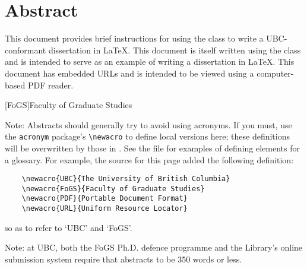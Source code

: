 
\chapter{Abstract}

This document provides brief instructions for using the 
class to write a \acs{UBC}-conformant dissertation in \LaTeX.  This
document is itself written using the  class and is
intended to serve as an example of writing a dissertation in \LaTeX.
This document has embedded \acp{URL} and is intended to be viewed
using a computer-based \ac{PDF} reader.

[FoGS]{Faculty of Graduate Studies}

Note: Abstracts should generally try to avoid using acronyms.  If you
must, use the \verb+acronym+ package's \verb+\newacro+ to define
local versions here; these definitions will be overwritten by those
in .  See the  file for
examples of defining elements for a glossary.
For example, the source for this page added the following definition:
\begin{verbatim}
    \newacro{UBC}{The University of British Columbia}
    \newacro{FoGS}{Faculty of Graduate Studies}
    \newacro{PDF}{Portable Document Format}
    \newacro{URL}{Uniform Resource Locator}
\end{verbatim}
so as to refer to `\ac{UBC}' and `\ac{FoGS}'.

Note: at \ac{UBC}, both the \ac{FoGS} Ph.D. defence programme and the
Library's online submission system require that abstracts to be 350
words or less.

\vfill
\begin{center}
\begin{sf}
\end{sf}
\end{center}
